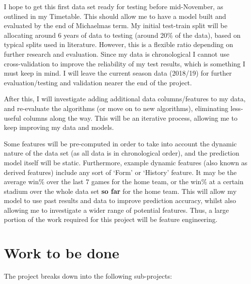 \documentclass[12pt,a4paper,twoside]{article}
\begin{document}
I hope to get this first data set ready for testing before mid-November, as outlined in my Timetable. This should allow me to have a model built and evaluated by the end of Michaelmas term. My initial test-train split will be allocating around 6 years of data to testing (around 20\% of the data), based on typical splits used in literature. However, this is a flexible ratio depending on further research and evaluation. Since my data is chronological I cannot use cross-validation to improve the reliability of my test results, which is something I must keep in mind. I will leave the current season data (2018/19) for further evaluation/testing and validation nearer the end of the project. 

After this, I will investigate adding additional data columns/features to my data, and re-evaluate the algorithms (or move on to new algorithms), eliminating less-useful columns along the way. This will be an iterative process, allowing me to keep improving my data and models. 

Some features will be pre-computed in order to take into account the dynamic nature of the data set (as all data is in chronological order), and the prediction model itself will be static. Furthermore, example dynamic features (also known as derived features) include any sort of `Form' or `History' feature. It may be the average win\% over the last 7 games for the home team, or the win\% at a certain stadium over the whole data set \textbf{so far} for the home team. This will allow my model to use past results and data to improve prediction accuracy, whilst also allowing me to investigate a wider range of potential features. Thus, a large portion of the work required for this project will be feature engineering. 




\section*{Work to be done}

The project breaks down into the following sub-projects:
\end{document}
